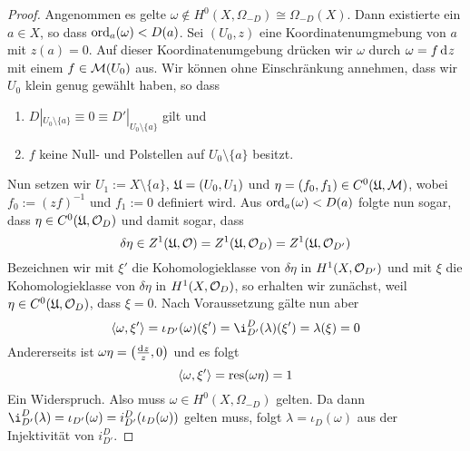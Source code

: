 \begin{proof}
  Angenommen es gelte $\omega \notin H^0(X, \Omega_{-D}) \cong
  \Omega_{-D}(X)$. Dann existierte ein $a \in X$, so dass
  $\operatorname{ord}_a(\omega) < D(a)$. Sei $(U_0, z)$ eine Koordinatenumgmebung
  von $a$ mit $z(a) = 0$. Auf dieser Koordinatenumgebung drücken wir
  $\omega$ durch $\omega = f \d[z]$ mit einem $f \in \mathcal{M}(U_0)$
  aus. Wir können ohne Einschränkung annehmen, dass wir $U_0$ klein
  genug gewählt haben, so dass
  \begin{enumerate}
  \item $D|_{U_0 \setminus \{a\}} \equiv 0 \equiv D'|_{U_0 \setminus
      \{a\}}$ gilt und
  \item $f$ keine Null- und Polstellen auf $U_0 \setminus \{a\}$ besitzt.
  \end{enumerate}
  Nun setzen wir $U_1 := X \setminus \{a\}$, $\mathfrak{U} = (U_0, U_1)$ und
  $\eta = (f_0, f_1) \in C^0(\mathfrak{U}, \mathcal{M})$, wobei $f_0 := (zf)^{-1}$ und
  $f_1 := 0$ definiert wird. Aus $\operatorname{ord}_a(\omega) < D(a)$ folgte nun
  sogar, dass $\eta \in C^0(\mathfrak{U}, \mathcal{O}_D)$ und damit sogar, dass
  \[
  \delta \eta \in Z^1(\mathfrak{U}, \mathcal{O}) = Z^1(\mathfrak{U}, \mathcal{O}_D) = Z^1(\mathfrak{U},
  \mathcal{O}_{D'})
  \]
  Bezeichnen wir mit $\xi'$ die
  Kohomologieklasse von $\delta \eta$ in $H^1(X, \mathcal{O}_{D'})$ und mit
  $\xi$ die Kohomologieklasse von $\delta \eta$ in $H^1(X, \mathcal{O}_D)$,
  so erhalten wir zunächst, weil $\eta \in C^0(\mathfrak{U}, \mathcal{O}_D)$, dass
  $\xi = 0$. Nach Voraussetzung gälte nun aber
  \[
  \g{\omega}{\xi'} = \iota_{D'}(\omega)(\xi') =
  \i_{D'}^D(\lambda)(\xi') = \lambda(\xi) = 0
  \]
  Andererseits ist $\omega \eta = \left ( \frac{\d[z]}{z}, 0 \right )$
  und es folgt
  \[
  \langle \omega, \xi' \rangle = \operatorname{res}(\omega \eta) = 1
  \]
  Ein Widerspruch. Also muss $\omega \in H^0(X, \Omega_{-D})$
  gelten. Da dann $\i_{D'}^D(\lambda) = \iota_{D'}(\omega) =
  i_{D'}^D(\iota_D(\omega))$ gelten muss, folgt $\lambda =
  \iota_D(\omega)$ aus der Injektivität von $i_{D'}^D$.
\end{proof}


